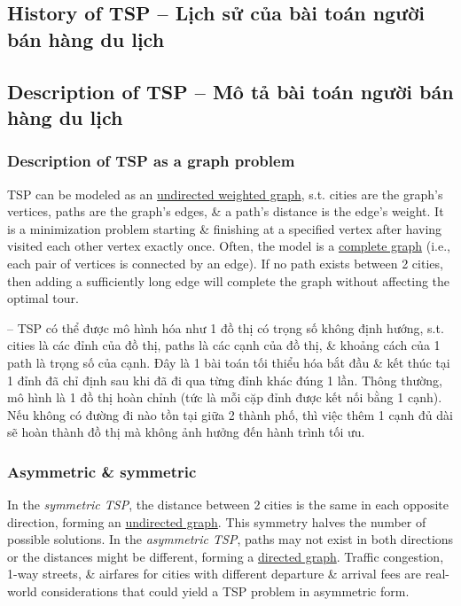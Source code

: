 \documentclass{article}
\begin{document}

\subsection{History of TSP -- Lịch sử của bài toán người bán hàng du lịch}


\subsection{Description of TSP -- Mô tả bài toán người bán hàng du lịch}


\subsubsection{Description of TSP as a graph problem}
TSP can be modeled as an \href{https://en.wikipedia.org/wiki/Graph_(discrete_mathematics)}{undirected weighted graph}, s.t. cities are the graph's vertices, paths are the graph's edges, \& a path's distance is the edge's weight. It is a minimization problem starting \& finishing at a specified vertex after having visited each other vertex exactly once. Often, the model is a \href{https://en.wikipedia.org/wiki/Complete_graph}{complete graph} (i.e., each pair of vertices is connected by an edge). If no path exists between 2 cities, then adding a sufficiently long edge will complete the graph without affecting the optimal tour.

-- TSP có thể được mô hình hóa như 1 đồ thị có trọng số không định hướng, s.t. cities là các đỉnh của đồ thị, paths là các cạnh của đồ thị, \& khoảng cách của 1 path là trọng số của cạnh. Đây là 1 bài toán tối thiểu hóa bắt đầu \& kết thúc tại 1 đỉnh đã chỉ định sau khi đã đi qua từng đỉnh khác đúng 1 lần. Thông thường, mô hình là 1 đồ thị hoàn chỉnh (tức là mỗi cặp đỉnh được kết nối bằng 1 cạnh). Nếu không có đường đi nào tồn tại giữa 2 thành phố, thì việc thêm 1 cạnh đủ dài sẽ hoàn thành đồ thị mà không ảnh hưởng đến hành trình tối ưu.


\subsubsection{Asymmetric \& symmetric}
In the {\it symmetric TSP}, the distance between 2 cities is the same in each opposite direction, forming an \href{https://en.wikipedia.org/wiki/Undirected_graph}{undirected graph}. This symmetry halves the number of possible solutions. In the {\it asymmetric TSP}, paths may not exist in both directions or the distances might be different, forming a \href{https://en.wikipedia.org/wiki/Directed_graph}{directed graph}. Traffic congestion, 1-way streets, \& airfares for cities with different departure \& arrival fees are real-world considerations that could yield a TSP problem in asymmetric form.
\end{document}
